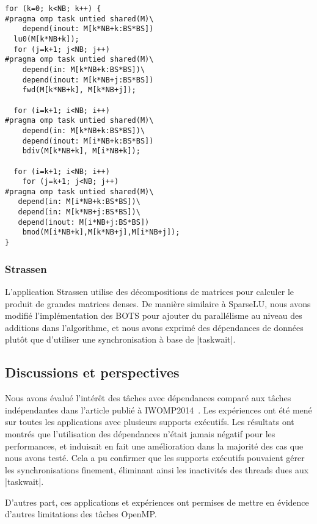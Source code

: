 \begin{lstlisting}[caption=LU utilisant des tâches avec dépendances,label=lst:kastors:sparseLU-deps]
for (k=0; k<NB; k++) {
#pragma omp task untied shared(M)\
    depend(inout: M[k*NB+k:BS*BS])
  lu0(M[k*NB+k]);
  for (j=k+1; j<NB; j++)
#pragma omp task untied shared(M)\
    depend(in: M[k*NB+k:BS*BS])\
    depend(inout: M[k*NB+j:BS*BS])
    fwd(M[k*NB+k], M[k*NB+j]);

  for (i=k+1; i<NB; i++)
#pragma omp task untied shared(M)\
    depend(in: M[k*NB+k:BS*BS])\
    depend(inout: M[i*NB+k:BS*BS])
    bdiv(M[k*NB+k], M[i*NB+k]);

  for (i=k+1; i<NB; i++)
    for (j=k+1; j<NB; j++)
#pragma omp task untied shared(M)\
   depend(in: M[i*NB+k:BS*BS])\
   depend(in: M[k*NB+j:BS*BS])\
   depend(inout: M[i*NB+j:BS*BS])
    bmod(M[i*NB+k],M[k*NB+j],M[i*NB+j]);
}
\end{lstlisting}

\subsubsection{Strassen}\label{sec:kastors:strassen}

L'application Strassen utilise des décompositions de matrices pour calculer le produit de grandes matrices denses.
De manière similaire à SparseLU, nous avons modifié l'implémentation des BOTS pour ajouter du parallélisme au niveau des additions dans l'algorithme, et nous avons exprimé des dépendances de données plutôt que d'utiliser une synchronisation à base de |taskwait|.

\subsection{Discussions et perspectives}

Nous avons évalué l'intérêt des tâches avec dépendances comparé aux tâches indépendantes dans l'article publié à IWOMP2014~\cite{Virouleau2014}.
Les expériences ont été mené sur toutes les applications avec plusieurs supports exécutifs.
Les résultats ont montrés que l'utilisation des dépendances n'était jamais négatif pour les performances, et induisait en fait une amélioration dans la majorité des cas que nous avons testé.
Cela a pu confirmer que les supports exécutifs pouvaient gérer les synchronisations finement, éliminant ainsi les inactivités des threads dues aux |taskwait|.

D'autres part, ces applications et expériences ont permises de mettre en évidence d'autres limitations des tâches OpenMP.

